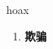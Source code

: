 
\begin{frame}
{\huge hoax}
\begin{center}
\begin{enumerate}\Large
  \item \textbf{欺骗}
\end{enumerate}
\end{center}
\end{frame}
